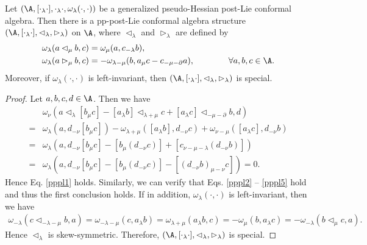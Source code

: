 \documentclass[12pt]{amsart}
\begin{document}
\begin{proposition}\label{phpl-pppl}
Let $(\A,[\cdot_\lambda\cdot],\cdot_\lambda\cdot,\omega_{\lambda}(\cdot,\cdot))$ be a generalized pseudo-Hessian post-Lie conformal algebra. Then there is a  pp-post-Lie conformal algebra structure $(\A,[\cdot_\lambda\cdot],\lhd_\lambda,\rhd_\lambda)$ on $\A$, where $\lhd_\lambda$ and $\rhd_\lambda$ are defined by
\begin{align}
    \label{pppl-cbf1}   &\omega_{\lambda}(a\lhd_\mu b,c)=\omega_{\mu}(a,c_{-\lambda} b),\\
    \label{pppl-cbf2}   &\omega_\lambda(a\rhd_\mu b,c)=-\omega_{\lambda-\mu}(b,a_\mu c-c_{-\mu-\partial}a),     \qquad \qquad\forall a,b,c\in\A.
\end{align}
Moreover, if $\omega_{\lambda}(\cdot,\cdot) $ is left-invariant, then  $(\A,[\cdot_\lambda\cdot],\lhd_\lambda,\rhd_\lambda)$ is special.
\end{proposition}
\begin{proof}
Let $a,b,c,d\in \A$. Then we have
\begin{align*}
    &\omega_\nu( a\lhd_\lambda[b_\mu c]-[a_\lambda b]\lhd_{\lambda+\mu}c+[a_\lambda c]\lhd_{-\mu-\partial}b,d  )\\
    =&\omega_\lambda(a ,d_{-\nu}[b_\mu c]  )-\omega_{\lambda+\mu}([a_\lambda b],d_{-\nu}c)+\omega_{\nu-\mu}([a_\lambda c],d_{-\nu}b)\\
    =&\omega_\lambda(a,d_{-\nu}[b_\mu c]-[b_\mu(d_{-\nu}c)]+[c_{\nu-\mu-\lambda}(d_{-\nu}b)])\\
    =&\omega_\lambda(a,d_{-\nu}[b_\mu c]-[b_\mu(d_{-\nu}c)]-[(d_{-\nu}b)_{\mu-\nu}c ]
    )=0.
\end{align*}
Hence Eq. \eqref{pppl1} holds. Similarly, we can verify that Eqs.
\eqref{pppl2} -- \eqref{pppl5} hold and thus the first conclusion
holds. If in addition, $\omega_{\lambda}(\cdot,\cdot)$ is
left-invariant, then we have
\begin{align*}
    \omega_{-\lambda}(c\lhd_{-\lambda-\mu} b,a )=\omega_{-\lambda-\mu}(c,a_\lambda b)= \omega_{\lambda+\mu}(a_\lambda b,c)
    = -\omega_\mu(b,a_\lambda
    c)=-\omega_{-\lambda}(b\lhd_{\mu}c,a).
\end{align*}
Hence $\lhd_\lambda$ is skew-symmetric. Therefore,
$(\A,[\cdot_\lambda\cdot],\lhd_\lambda,\rhd_\lambda)$ is special.
\end{proof}
\end{document}
